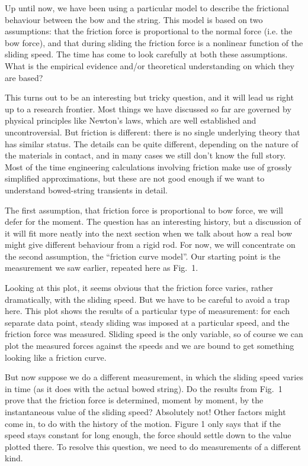 

  Up until now, we have been using a particular model to describe the 
  frictional behaviour between the bow and the string. This model is based on 
  two assumptions: that the friction force is proportional to the normal force 
  (i.e. the bow force), and that during sliding the friction force is a 
  nonlinear function of the sliding speed. The time has come to look carefully 
  at both these assumptions. What is the empirical evidence and/or theoretical 
  understanding on which they are based? 

  This turns out to be an interesting but tricky question, and it will lead us 
  right up to a research frontier. Most things we have discussed so far are 
  governed by physical principles like Newton’s laws, which are well 
  established and uncontroversial. But friction is different: there is no 
  single underlying theory that has similar status. The details can be quite 
  different, depending on the nature of the materials in contact, and in many 
  cases we still don’t know the full story. Most of the time engineering 
  calculations involving friction make use of grossly simplified 
  approximations, but these are not good enough if we want to understand 
  bowed-string transients in detail. 

  The first assumption, that friction force is proportional to bow force, we 
  will defer for the moment. The question has an interesting history, but a 
  discussion of it will fit more neatly into the next section when we talk 
  about how a real bow might give different behaviour from a rigid rod. For 
  now, we will concentrate on the second assumption, the “friction curve 
  model”. Our starting point is the measurement we saw earlier, repeated here 
  as Fig.\ 1. 

  Looking at this plot, it seems obvious that the friction force varies, rather 
  dramatically, with the sliding speed. But we have to be careful to avoid a 
  trap here. This plot shows the results of a particular type of measurement: 
  for each separate data point, steady sliding was imposed at a particular 
  speed, and the friction force was measured. Sliding speed is the only 
  variable, so of course we can plot the measured forces against the speeds and 
  we are bound to get something looking like a friction curve. 

  But now suppose we do a different measurement, in which the sliding speed 
  varies in time (as it does with the actual bowed string). Do the results from 
  Fig.\ 1 prove that the friction force is determined, moment by moment, by the 
  instantaneous value of the sliding speed? Absolutely not! Other factors might 
  come in, to do with the history of the motion. Figure 1 only says that if the 
  speed stays constant for long enough, the force should settle down to the 
  value plotted there. To resolve this question, we need to do measurements of 
  a different kind. 

